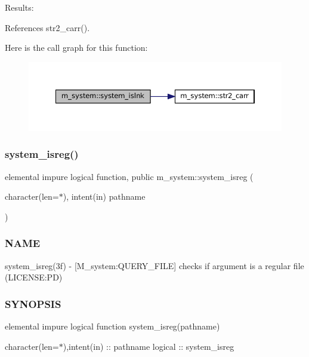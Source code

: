 Results\+: 

References str2\+\_\+carr().

Here is the call graph for this function\+:\nopagebreak
\begin{figure}[H]
\begin{center}
\leavevmode
\includegraphics[width=350pt]{namespacem__system_a268d0cd27be36527894fe2cae0f1b9f6_cgraph}
\end{center}
\end{figure}
\mbox{\label{namespacem__system_a8ea0d0430227af61b8083b4e7d6e597d}} 
\subsubsection{\texorpdfstring{system\+\_\+isreg()}{system\_isreg()}}
{\footnotesize\ttfamily elemental impure logical function, public m\+\_\+system\+::system\+\_\+isreg (\begin{DoxyParamCaption}\item[{character(len=$\ast$), intent(in)}]{pathname }\end{DoxyParamCaption})}



\subsubsection*{N\+A\+ME}

system\+\_\+isreg(3f) -\/ \mbox{[}M\+\_\+system\+:Q\+U\+E\+R\+Y\+\_\+\+F\+I\+LE\mbox{]} checks if argument is a regular file (L\+I\+C\+E\+N\+SE\+:PD) 

\subsubsection*{S\+Y\+N\+O\+P\+S\+IS}

elemental impure logical function system\+\_\+isreg(pathname)

character(len=$\ast$),intent(in) \+:\+: pathname logical \+:\+: system\+\_\+isreg

